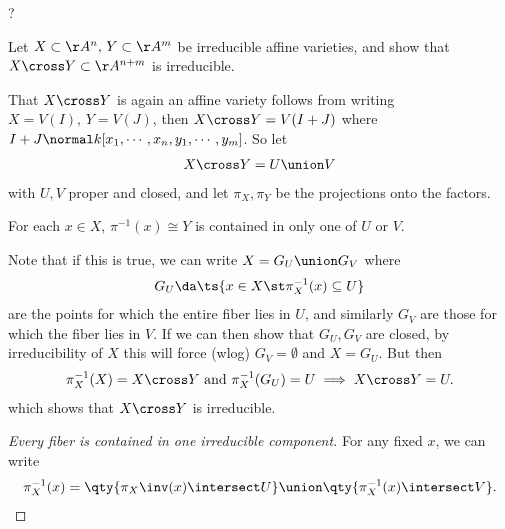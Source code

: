 \begin{solution}

?

\end{solution}

\begin{exercise}[Gathmann 2.24]

Let \(X \subset \AA^n,\, Y\subset \AA^m\) be irreducible affine
varieties, and show that \(X\cross Y\subset \AA^{n+m}\) is irreducible.

\end{exercise}

\begin{solution}

That \(X\cross Y\) is again an affine variety follows from writing
\(X=V(I),\, Y=V(J)\), then \(X\cross Y = V(I+J)\) where
\(I+J\normal k[x_1, \cdots, x_n, y_1, \cdots, y_m]\). So let
\begin{align*}X\cross Y = U \union V\end{align*} with \(U, V\) proper
and closed, and let \(\pi_X, \pi_Y\) be the projections onto the
factors.

\begin{claim}

For each \(x\in X\), \(\pi^{-1}(x) \cong Y\) is contained in only one of
\(U\) or \(V\).

\end{claim}

Note that if this is true, we can write \(X = G_U \union G_V\) where
\begin{align*}  
G_U\da\ts{x\in X \st \pi_X^{-1}(x) \subseteq U}
\end{align*} are the points for which the entire fiber lies in \(U\),
and similarly \(G_V\) are those for which the fiber lies in \(V\). If we
can then show that \(G_U, G_V\) are closed, by irreducibility of \(X\)
this will force (wlog) \(G_V = \emptyset\) and \(X = G_U\). But then
\begin{align*}  
\pi_X^{-1}(X) = X\cross Y \text{ and }\pi_X^{-1}(G_U) = U  \implies X\cross Y = U
.\end{align*} which shows that \(X\cross Y\) is irreducible.

\begin{proof}[Every fiber is contained in one irreducible component]

For any fixed \(x\), we can write
\begin{align*}  
\pi_X^{-1}(x) = \qty{\pi_X\inv(x) \intersect U } \union \qty{\pi_X^{-1}(x) \intersect V}
.\end{align*}


\end{proof}
\end{solution}
